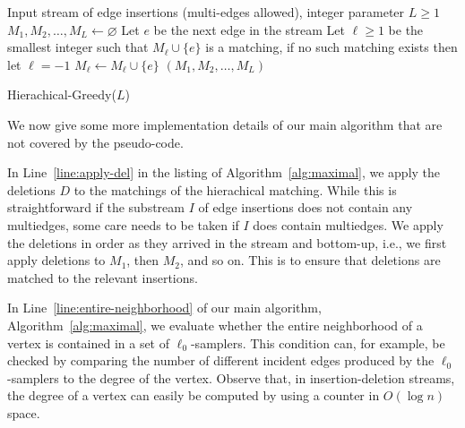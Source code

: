 \documentclass[11pt,a4paper]{article}
\begin{document}
\begin{algorithm}
    \begin{algorithmic}[1]
        \REQUIRE Input stream of edge insertions (multi-edges allowed), integer parameter $L \ge 1$
        \STATE $M_1, M_2, \dots, M_{L} \gets \varnothing$
            \STATE Let $e$ be the next edge in the stream
            \STATE Let $\ell \ge 1$ be the smallest integer such that $M_{\ell} \cup \{e\}$ is a matching, if no such matching exists then let $\ell = -1$
                \STATE $M_{\ell} \gets M_{\ell} \cup \{e\}$
            \ENDIF
        \ENDWHILE
        \RETURN $(M_1, M_2, \dots, M_{L})$
    \end{algorithmic}
    \caption{\textsf{Hierachical-Greedy($L$)}  \label{alg:hierachical-matching}}
\end{algorithm}

We now give some more implementation details of our main algorithm that are not covered by the pseudo-code.

In Line~\ref{line:apply-del} in the listing of Algorithm~\ref{alg:maximal}, we apply the deletions $D$ to the matchings of the hierachical matching. While this is straightforward if the substream $I$ of edge insertions does not contain any multiedges, some care needs to be taken if $I$ does contain multiedges. We apply the deletions in order as they arrived in the stream and bottom-up, i.e., we first apply deletions to $M_1$, then $M_2$, and so on. This is to ensure that deletions are matched to the relevant insertions.

In Line~\ref{line:entire-neighborhood} of our main algorithm, Algorithm~\ref{alg:maximal}, we evaluate whether the entire neighborhood of a vertex is contained in a set of $\ell_0$-samplers. This condition can, for example, be checked by comparing the number of different incident edges produced by the $\ell_0$-samplers to the degree of the vertex. Observe that, in insertion-deletion streams, the degree of a vertex can easily be computed by using a counter in $O(\log n)$ space. 
\end{document}

